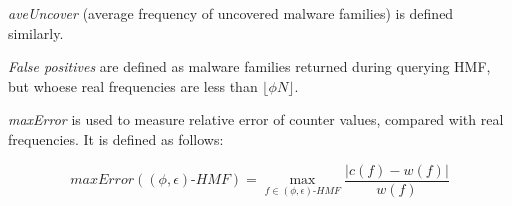 \textit{aveUncover} (average frequency of uncovered malware families) is defined similarly. 

\textit{False positives} are defined as malware families returned during querying HMF, but whoese
real frequencies are less than $\lfloor \phi N \rfloor$. 

\textit{maxError} is used to measure relative error of counter values, compared with real frequencies.
It is defined as follows:

$$maxError((\phi, \epsilon)\mbox{-}HMF) = \max_{f \in (\phi, \epsilon)\mbox{-}HMF} \dfrac{\left|c(f) - w(f)\right|}{w(f)}$$





